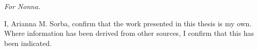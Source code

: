 \maketitle

\chapter*{}
\begin{flushright}
\large{\textit{For Nonna.}}
\end{flushright}

\begin{declaration} %
I, Arianna M. Sorba, confirm that the work presented in this thesis is my own.
Where information has been derived from other sources, I confirm that this has been indicated.
\\
\\
\\
\\
\\
\\
\\
\\

\end{declaration}


